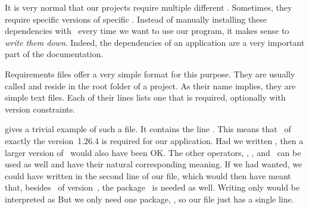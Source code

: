 %
%
\label{sec:requirementsFiles}%
%
%
%
%
%
%
%
It is very normal that our projects require multiple different .
Sometimes, they require specific versions of specific .
Instead of manually installing these dependencies with \pip\ every time we want to use our program, it makes sense to \emph{write them down}.
Indeed, the dependencies of an application are a very important part of the documentation.%
%
\begin{sloppypar}%
Requirements files offer a very simple format for this purpose.
They are usually called  and reside in the root folder of a project.
As their name implies, they are simple text files.
Each of their lines lists one  that is required, optionally with version constraints.%
\end{sloppypar}%
%
 gives a trivial example of such a file.
It contains the line .
This means that \numpy\ of exactly the version~1.26.4 is required for our application.
Had we written , then a larger version of \numpy\ would also have been OK.
The other operators, \textil{>}, \textil{<}, and~\textil{<=} can be used as well and have their natural corresponding meaning.
If we had wanted, we could have written  in the second line of our  file, which would then have meant that, besides \numpy\ of version~, the package \matplotlib\ is needed as well.
Writing only  would be interpreted as 
But we only need one package, \numpy, so our file just has a single line.

